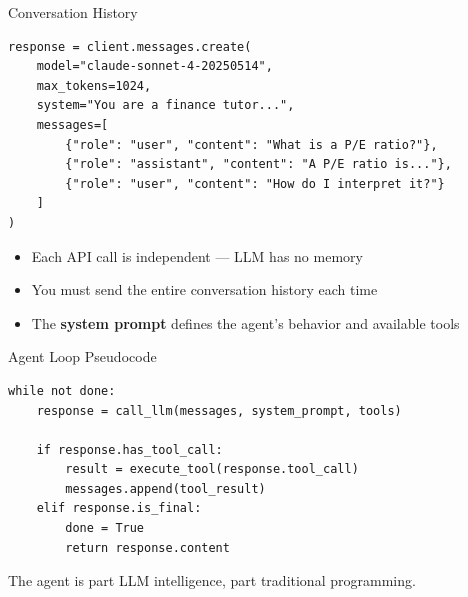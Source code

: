 \documentclass[aspectratio=169]{beamer}
\begin{document}
\begin{frame}[fragile,shrink=5]{Conversation History}
\begin{shadedbox}[title=\textbf{Messages Are a List of Dictionaries}]
\begin{verbatim}
response = client.messages.create(
    model="claude-sonnet-4-20250514",
    max_tokens=1024,
    system="You are a finance tutor...",
    messages=[
        {"role": "user", "content": "What is a P/E ratio?"},
        {"role": "assistant", "content": "A P/E ratio is..."},
        {"role": "user", "content": "How do I interpret it?"}
    ]
)
\end{verbatim}
\end{shadedbox}
\vspace{0.3cm}
\begin{itemize}\small
  \item Each API call is independent --- LLM has no memory
  \item You must send the \alert{entire conversation history} each time
  \item The \textbf{system prompt} defines the agent's behavior and available tools
\end{itemize}
\end{frame}

\begin{frame}[fragile]{Agent Loop Pseudocode}
\begin{shadedbox}[title=\textbf{The Agent's Decision Loop}]
\begin{verbatim}
while not done:
    response = call_llm(messages, system_prompt, tools)

    if response.has_tool_call:
        result = execute_tool(response.tool_call)
        messages.append(tool_result)
    elif response.is_final:
        done = True
        return response.content
\end{verbatim}
\end{shadedbox}
\vspace{0.3cm}
\begin{center}
\alert{The agent is part LLM intelligence, part traditional programming.}
\end{center}
\end{frame}
\end{document}
